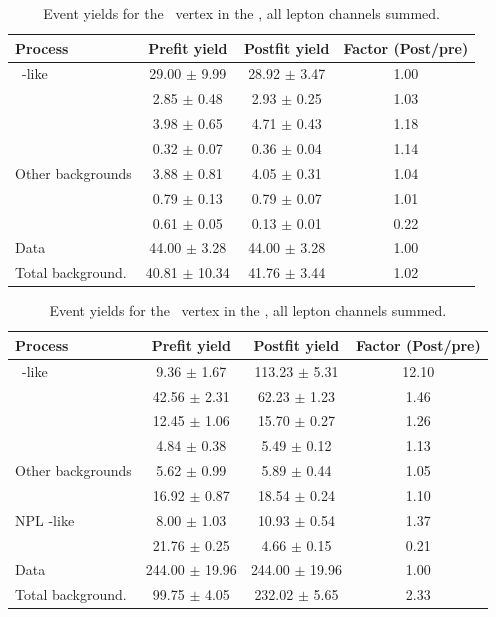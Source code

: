 \begin{table}[htbp]
	\centering
		\caption{Event yields for the \Zut\ vertex in the \TTCR,   all lepton channels summed. }
	
	\begin{tabular} {l c c c }
		\toprule
		Process & Prefit yield & Postfit yield & Factor (Post/pre) \\
		\midrule
		\NPL\ \ttbar-like & 29.00 $ \pm $ 9.99 & 28.92 $ \pm $ 3.47 & 1.00 \\ 
		\ttZ & 2.85 $ \pm $ 0.48 & 2.93 $ \pm $ 0.25 & 1.03 \\ 
		\WZ & 3.98 $ \pm $ 0.65 & 4.71 $ \pm $ 0.43 & 1.18 \\ 
		\ZZ & 0.32 $ \pm $ 0.07 & 0.36 $ \pm $ 0.04 & 1.14 \\ 
		Other backgrounds & 3.88 $ \pm $ 0.81 & 4.05 $ \pm $ 0.31 & 1.04 \\ 
		\tZq & 0.79 $ \pm $ 0.13 & 0.79 $ \pm $ 0.07 & 1.01 \\ 
		\kZut  & 0.61 $ \pm $ 0.05 & 0.13 $ \pm $ 0.01 & 0.22 \B \\
		\hdashline
		Data & 44.00 $ \pm $ 3.28 & 44.00 $ \pm $ 3.28 & 1.00 \T \\
		Total background. & 40.81 $ \pm $ 10.34 & 41.76 $ \pm $ 3.44 & 1.02\\
		\bottomrule
	\end{tabular}
\end{table}

\begin{table}[htbp]
	\centering
		\caption{Event yields for the \Zut\ vertex in the \TTSR,   all lepton channels summed. }
	
	\begin{tabular} {l c c c }
		\toprule
		Process & Prefit yield & Postfit yield & Factor (Post/pre) \\
		\midrule
		\NPL\ \DY-like & 9.36 $ \pm $ 1.67 & 113.23 $ \pm $ 5.31 & 12.10 \\ 
		\ttZ & 42.56 $ \pm $ 2.31 & 62.23 $ \pm $ 1.23 & 1.46 \\ 
		\WZ & 12.45 $ \pm $ 1.06 & 15.70 $ \pm $ 0.27 & 1.26 \\ 
		\ZZ & 4.84 $ \pm $ 0.38 & 5.49 $ \pm $ 0.12 & 1.13 \\ 
		Other backgrounds & 5.62 $ \pm $ 0.99 & 5.89 $ \pm $ 0.44 & 1.05 \\ 
		\tZq & 16.92 $ \pm $ 0.87 & 18.54 $ \pm $ 0.24 & 1.10 \\ 
		NPL \ttbar-like & 8.00 $ \pm $ 1.03 & 10.93 $ \pm $ 0.54 & 1.37\\
		\kZut  & 21.76 $ \pm $ 0.25 & 4.66 $ \pm $ 0.15 & 0.21 \B \\
		\hdashline
		Data & 244.00 $ \pm $ 19.96 & 244.00 $ \pm $ 19.96 & 1.00 \T \\
		Total background. & 99.75 $ \pm $ 4.05 & 232.02 $ \pm $ 5.65 & 2.33\\
		\bottomrule
	\end{tabular}
\end{table}

